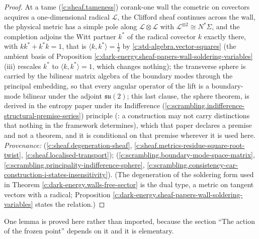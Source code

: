 \documentclass[11pt]{article}
\theoremstyle{definition}
\theoremstyle{plain}
\providecommand{\ip}{}\renewcommand{\ip}[2]{\langle #1, #2\rangle}
\begin{document}
\begin{proof}
At a tame (\ref{c:sheaf.tameness}) corank-one wall the cometric on covectors acquires a one-dimensional radical $\mathcal{L}$, the Clifford sheaf continues across the wall, the physical metric has a simple pole along $\mathcal{L}\otimes\mathcal{L}$ with $\mathcal{L}^{\otimes 2} \cong N^*\Sigma$, and the completion adjoins the Witt partner $k^*$ of the radical covector $k$ exactly there, with $kk^* + k^*k = 1$, that is $\ip{k}{k^*} = \tfrac12$ by \ref{c:std-algebra.vector-squares} (the ambient basis of Proposition \ref{c:dark-energy.sheaf-papers-wall-soldering-variables}(iii) rescales $k^*$ to $\ip{k}{k^*} = 1$, which changes nothing); the transverse sphere is carried by the bilinear matrix algebra of the boundary modes through the principal embedding, so that every angular operator of the lift is a boundary-mode bilinear under the adjoint $\mathfrak{su}(2)$; this last clause, the sphere theorem, is derived in the entropy paper under its Indifference (\ref{c:scrambling.indifference-structural-premise-series}) principle (\cite[Principle~5.4]{ButlerT8}: a construction may not carry distinctions that nothing in the framework determines), which that paper declares a premise and not a theorem, and it is conditional on that premise wherever it is used here. \emph{Provenance:} \cite[Thm.~3.1, Cor.~4.5, Thm.~6.2]{ButlerT4} (\ref{c:sheaf.degeneration-sheaf}, \ref{c:sheaf.metrics-residue-square-root-twist}, \ref{c:sheaf.localised-transport}); \cite[Prop.~5.2, Principle~5.4, Thm.~5.5, Prop.~5.6]{ButlerT8} (\ref{c:scrambling.boundary-mode-space-matrix}, \ref{c:scrambling.principality-indifference-sphere}, \ref{c:scrambling.consistency-car-construction-i-states-insensitivity}). (The degeneration of the soldering form used in Theorem \ref{c:dark-energy.walls-free-sector} is the dual type, a metric on tangent vectors with a radical; Proposition \ref{c:dark-energy.sheaf-papers-wall-soldering-variables} states the relation.)

\end{proof}

\label{c:note.dark-energy.setting-setting-imports-2}
One lemma is proved here rather than imported, because the section ``The action of the frozen point'' depends on it and it is elementary.
\end{document}
